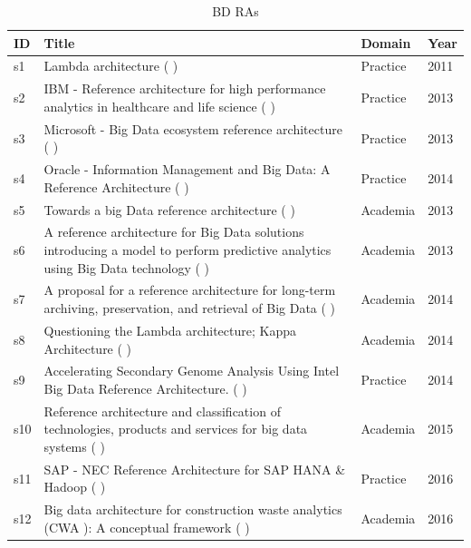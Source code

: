 \documentclass{ieeeaccess}
\begin{document}
\begin{table}
    \renewcommand*{\arraystretch}{1.4}
    \caption{BD RAs}
    \label{table:bdRAs}
    \begin{tabular}{|p{0.4cm}|p{14.3cm}|p{1.2cm}|p{0.5cm}|}
    \hline
    \textbf{ID} & \textbf{Title} & \textbf{Domain} & \textbf{Year} \\
    \hline
    s1 & Lambda architecture (\cite{kiran2015lambda} ) & Practice  &  2011   \\
    \hline
    s2 & IBM - Reference architecture for high performance analytics in healthcare and life science (\cite{quintero2019ibm} ) & Practice  &  2013   \\
    \hline
    s3 &  Microsoft - Big Data ecosystem reference architecture  (\cite{levin2013big} ) & Practice  &  2013   \\
    \hline
    s4 &  Oracle - Information Management and Big Data: A Reference Architecture  (\cite{cackett2013information} ) & Practice  &  2014   \\
    \hline
    s5 & Towards a big Data reference architecture (\cite{Maier} ) & Academia  &  2013   \\
    \hline
    s6 & A reference architecture for Big Data solutions introducing a model to perform predictive analytics using Big Data technology (\cite{geerdink2013reference} ) & Academia  &  2013   \\
    \hline
    s7 & A proposal for a reference architecture for long-term archiving, preservation, and retrieval of Big Data (\cite{viana2014proposal} ) & Academia  &  2014   \\
    \hline
    s8 & Questioning the Lambda architecture; Kappa Architecture (\cite{kreps2014questioning} ) & Academia  &  2014   \\
    \hline
    s9 & Accelerating Secondary Genome Analysis Using Intel Big Data Reference Architecture. (\cite{SikoraWohlfeld2014} ) & Practice  &  2014  \\
    \hline
    s10 & Reference architecture and classification of technologies, products and services for big data systems (\cite{paakkonen2015reference} ) & Academia  &  2015   \\
    \hline
    s11 &  SAP - NEC Reference Architecture for SAP HANA \& Hadoop (\cite{SAPRA} ) & Practice  &  2016   \\
    \hline
    s12 & Big data architecture for construction waste analytics (CWA ): A conceptual framework (\cite{bilal2016big} ) & Academia  &  2016   \\
    \hline

\end{tabular}
\end{table}
\end{document}
